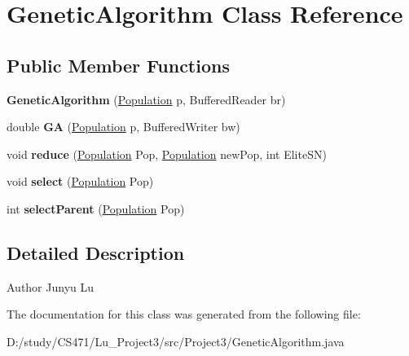 \hypertarget{class_genetic_algorithm}{}\section{Genetic\+Algorithm Class Reference}
\label{class_genetic_algorithm}
\subsection*{Public Member Functions}
\begin{DoxyCompactItemize}
\item 
\mbox{\label{class_genetic_algorithm_ad475247c4141c32fda43f3f7ae48941c}} 
{\bfseries Genetic\+Algorithm} (\mbox{\hyperlink{class_population}{Population}} p, Buffered\+Reader br)
\item 
\mbox{\label{class_genetic_algorithm_ace9073a59f771bc9cc82c8a9ca305735}} 
double {\bfseries GA} (\mbox{\hyperlink{class_population}{Population}} p, Buffered\+Writer bw)
\item 
\mbox{\label{class_genetic_algorithm_a2ec1d7d742d246360cb54853ceb7c4c9}} 
void {\bfseries reduce} (\mbox{\hyperlink{class_population}{Population}} Pop, \mbox{\hyperlink{class_population}{Population}} new\+Pop, int Elite\+SN)
\item 
\mbox{\label{class_genetic_algorithm_a949800fa7775570471957dffa17d0875}} 
void {\bfseries select} (\mbox{\hyperlink{class_population}{Population}} Pop)
\item 
\mbox{\label{class_genetic_algorithm_a4cc54aeaa6868ab085b3f29f62b63d45}} 
int {\bfseries select\+Parent} (\mbox{\hyperlink{class_population}{Population}} Pop)
\end{DoxyCompactItemize}


\subsection{Detailed Description}
\begin{DoxyAuthor}{Author}
Junyu Lu 
\end{DoxyAuthor}


The documentation for this class was generated from the following file\+:\begin{DoxyCompactItemize}
\item 
D\+:/study/\+C\+S471/\+Lu\+\_\+\+Project3/src/\+Project3/Genetic\+Algorithm.\+java\end{DoxyCompactItemize}
